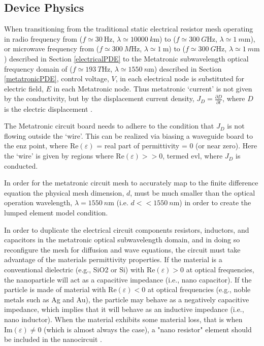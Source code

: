 \subsection{Device Physics}\label{device_physics}

\par When transitioning from the traditional static electrical resistor mesh operating in radio frequency from ($f \simeq \SI{30}{\hertz}$, $\lambda \simeq \SI{10000}{k\meter}$) to ($f \simeq \SI{300}{G \hertz}$, $\lambda \simeq \SI{1}{m\meter}$), or microwave frequency from ($f \simeq \SI{300}{M\hertz}$, $\lambda \simeq \SI{1}{\meter}$) to ($f \simeq \SI{300}{G \hertz}$, $\lambda \simeq \SI{1}{m\meter}$) described in Section \ref{electricalPDE} to the Metatronic subwavelength optical frequency domain of ($f \simeq \SI{193}{T\hertz}$, $\lambda \simeq \SI{1550}{n\meter}$) described in Section \ref{metatronicPDE}, control voltage, $V$, in each electrical node is substituted for electric field, $E$ in each Metatronic node. Thus metatronic ‘current’ is not given by the conductivity, but by the displacement current density, $J_D = \frac{\partial D}{\partial t}$, where $D$ is the electric displacement \cite{vakil2011transformation}.

\par The Metatronic circuit board needs to adhere to the condition that $J_D$ is not flowing outside the ‘wire’. This can be realized via biasing a waveguide board to the \acrfull{enz} point, where  $\text{Re}(\varepsilon)$ = real part of permittivity = 0 (or near zero). Here the ‘wire’ is given by regions where $\text{Re}(\varepsilon) >> 0$, termed \acrfull{evl}, where $J_D$ is conducted. 

\Par In order for the metatronic circuit mesh to accurately map to the finite difference equation the physical mesh dimension, $d$, must be much smaller than the optical operation wavelength, $\lambda = \SI{1550}{n\meter}$ (i.e. $d << \SI{1550}{n\meter}$) in order to create the \gls{lumped element model} condition. 

\par In order to duplicate the electrical circuit components resistors, inductors, and capacitors in the metatronic optical subwavelength domain, and in doing so reconfigure the mesh for diffusion and wave equations, the circuit must take advantage of the materials permittivity properties. If the material is a conventional dielectric (e.g., SiO2 or Si) with $\text{Re}(\varepsilon) > 0$ at optical frequencies, the nanoparticle will act as a capacitive impedance (i.e., nano capacitor). If the particle is made of material with $\text{Re}(\varepsilon) < 0$ at optical frequencies (e.g., noble metals such as Ag and Au), the particle may behave as a negatively capacitive impedance, which  implies that it will behave as an inductive impedance (i.e., nano inductor). When the material exhibits some material loss, that is when $\text{Im}(\varepsilon) \neq 0$ (which is almost always the case), a "nano resistor" element should be included in the nanocircuit \cite{N.Engheta_2007}.

